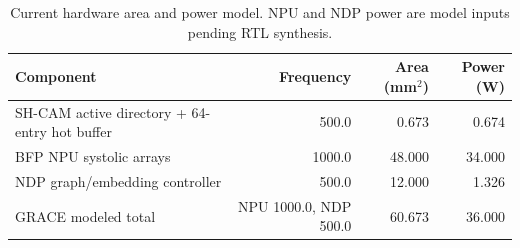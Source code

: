 \begin{table}[t]
\centering
\caption{Current hardware area and power model. NPU and NDP power are model inputs pending RTL synthesis.}
\label{tab:hardware-area}
\begin{tabular}{lrrr}
\toprule
Component & Frequency & Area (mm$^2$) & Power (W) \\
\midrule
SH-CAM active directory + 64-entry hot buffer & 500.0 & 0.673 & 0.674 \\
BFP NPU systolic arrays & 1000.0 & 48.000 & 34.000 \\
NDP graph/embedding controller & 500.0 & 12.000 & 1.326 \\
GRACE modeled total & NPU 1000.0, NDP 500.0 & 60.673 & 36.000 \\
\bottomrule
\end{tabular}
\end{table}
